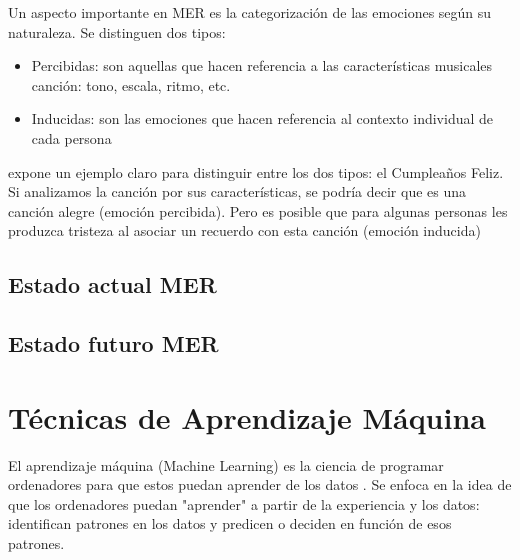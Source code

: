 \documentclass[12pt,a4paper,Spanish]{book}
\begin{document}
Un aspecto importante en MER es la categorización de las emociones según su naturaleza. Se distinguen dos tipos:
\begin{itemize}
\item Percibidas: son aquellas que hacen referencia a las características musicales canción: tono, escala, ritmo, etc.
\item Inducidas: son las emociones que hacen referencia al contexto individual de cada persona
\end{itemize}
\cite{yang2011music} expone un ejemplo claro para distinguir entre los dos tipos: el Cumpleaños Feliz. Si analizamos la canción por sus características, se podría decir que es una canción alegre (emoción percibida). Pero es posible que para algunas personas les produzca tristeza al asociar un recuerdo con esta canción (emoción inducida)

\subsection{Estado actual MER}

\subsection{Estado futuro MER}


\section{Técnicas de Aprendizaje Máquina}

El aprendizaje máquina (Machine Learning) es la ciencia de programar ordenadores para que estos puedan aprender de los datos \cite{geron2022hands}. Se enfoca en la idea de que los ordenadores puedan "aprender" a partir de la experiencia y los datos: identifican patrones en los datos y predicen o deciden en función de esos patrones.
\end{document}
